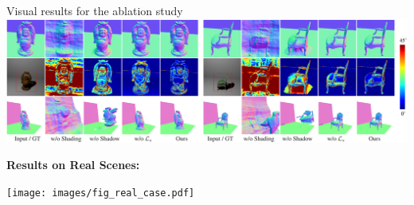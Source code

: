 \documentclass[landscape,a0paper,fontscale=0.292]{baposter}
\begin{document}
\begin{poster}
{\begin{minipage}[t]{0.49\textwidth}
\begin{center}
        \end{center}
        \vspace{-1.6em}
        \begin{center}
            Visual results for the ablation study \\
            \includegraphics[align=c,width=\textwidth]{images/fig_ablation.pdf} 
        \end{center}
        
        
        \vspace{-0.3em}
        \textbf{\color{ctitle}Results on Real Scenes:}
        \vspace{-0.5em}
        \begin{center}
            \texttt{[image: images/fig\_real\_case.pdf]} 
        \end{center}
        

\end{minipage}}
\end{poster}
\end{document}

